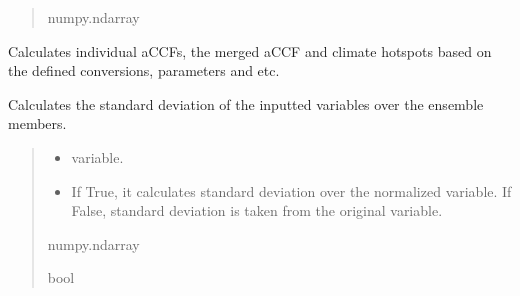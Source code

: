 \documentclass[a4paper,11pt,english]{sphinxmanual}
\begin{document}
\begin{fulllineitems}
\begin{fulllineitems}
\begin{quote}
\begin{description}
\sphinxAtStartPar
numpy.ndarray

\end{description}\end{quote}

\end{fulllineitems}


\begin{fulllineitems}
\label{\detokenize{modules:envlib.accf.GeTaCCFs.get_accfs}}
\pysigstartsignatures
{}
\pysigstopsignatures
\sphinxAtStartPar
Calculates individual aCCFs, the merged aCCF and climate hotspots based on the defined conversions, parameters and etc.

\end{fulllineitems}


\begin{fulllineitems}
\label{\detokenize{modules:envlib.accf.GeTaCCFs.get_std}}
\pysigstartsignatures
{}
\pysigstopsignatures
\sphinxAtStartPar
Calculates the standard deviation of the inputted variables over the ensemble members.
\begin{quote}\begin{description}
\begin{itemize}
\item {} 
\sphinxAtStartPar
{} \textendash{} variable.

\item {} 
\sphinxAtStartPar
{} \textendash{} If True, it calculates standard deviation over the normalized variable. If False, standard deviation is taken from the original variable.

\end{itemize}

\sphinxAtStartPar
numpy.ndarray

\sphinxAtStartPar
bool


\end{description}
\end{quote}
\end{fulllineitems}
\end{fulllineitems}
\end{document}
